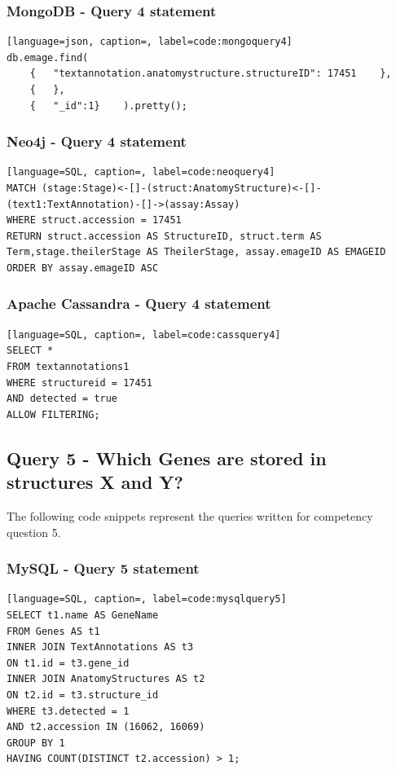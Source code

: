 \subsubsection*{MongoDB - Query 4 statement}\label{mongoquery4statement}

\begin{lstlisting}[language=json, caption=, label=code:mongoquery4]
db.emage.find(
	{	"textannotation.anatomystructure.structureID": 17451	},
	{	},
	{	"_id":1}	).pretty();
\end{lstlisting}

\subsubsection*{Neo4j - Query 4 statement}\label{neoquery4statement}

\begin{lstlisting}[language=SQL, caption=, label=code:neoquery4]
MATCH (stage:Stage)<-[]-(struct:AnatomyStructure)<-[]-(text1:TextAnnotation)-[]->(assay:Assay)
WHERE struct.accession = 17451
RETURN struct.accession AS StructureID, struct.term AS Term,stage.theilerStage AS TheilerStage, assay.emageID AS EMAGEID
ORDER BY assay.emageID ASC
\end{lstlisting}

\subsubsection*{Apache Cassandra - Query 4 statement}\label{cassquery4statement}

\begin{lstlisting}[language=SQL, caption=, label=code:cassquery4]
SELECT *
FROM textannotations1
WHERE structureid = 17451
AND detected = true
ALLOW FILTERING;
\end{lstlisting}

\subsection*{Query 5 - Which Genes are stored in structures X and Y?}\label{query5}
The following code snippets represent the queries written for competency question 5.

\subsubsection*{MySQL - Query 5 statement}\label{mysqlquery5statement}

\begin{lstlisting}[language=SQL, caption=, label=code:mysqlquery5]
SELECT t1.name AS GeneName
FROM Genes AS t1
INNER JOIN TextAnnotations AS t3
ON t1.id = t3.gene_id
INNER JOIN AnatomyStructures AS t2
ON t2.id = t3.structure_id
WHERE t3.detected = 1
AND t2.accession IN (16062, 16069)
GROUP BY 1
HAVING COUNT(DISTINCT t2.accession) > 1;
\end{lstlisting}

